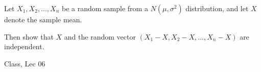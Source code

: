 \begin{samepage}
\begin{ex}
Let $X_1, X_2, . . . , X_n$ be a random sample from a $N(\mu, \sigma^2)$ distribution, and let $X$ denote the sample mean.

Then show that $X$ and the random vector $(X_1 - X, X_2 - X, . . . , X_n - X)$ are independent.
\end{ex}
\begin{source}
Class, Lec 06
\end{source}
\end{samepage}
